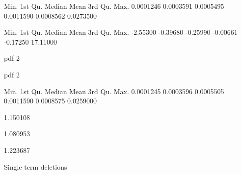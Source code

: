 \documentclass[a4paper]{article}                %
\begin{document}
\begin{Schunk}
\begin{Soutput}
     Min.   1st Qu.    Median      Mean   3rd Qu.      Max. 
0.0001246 0.0003591 0.0005495 0.0011590 0.0008562 0.0273500 
\end{Soutput}
\begin{Soutput}
    Min.  1st Qu.   Median     Mean  3rd Qu.     Max. 
-2.55300 -0.39680 -0.25990 -0.00661 -0.17250 17.11000 
\end{Soutput}
\begin{Soutput}
pdf 
  2 
\end{Soutput}
\begin{Soutput}
pdf 
  2 
\end{Soutput}
\begin{Soutput}
     Min.   1st Qu.    Median      Mean   3rd Qu.      Max. 
0.0001245 0.0003596 0.0005505 0.0011590 0.0008575 0.0259000 
\end{Soutput}
\begin{Soutput}
[1] 1.150108
\end{Soutput}
\begin{Soutput}
[1] 1.080953
\end{Soutput}
\begin{Soutput}
[1] 1.223687
\end{Soutput}
\begin{Soutput}
Single term deletions


\end{Soutput}
\end{Schunk}
\end{document}
